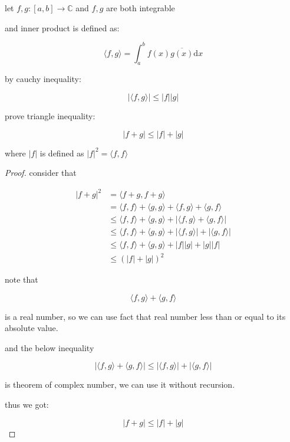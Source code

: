 \begin{exercise}
    let $f,g: [a,b] \to \mathbb{C}$ and $f,g$ are both integrable

    and inner product is defined as:

    \[
        \langle f, g \rangle = \int_a^{b} f(x) \overline{g(x)} \mathrm{d}x
    \]

    by cauchy inequality:

    \[
        \left| \langle f, g \rangle \right| \le \left| f \right| \left| g \right|
    \]
    
    prove triangle inequality:

    \[
        |f + g| \le |f| + |g|
    \]

    where $|f|$ is defined as $|f|^2 = \langle f, f \rangle $
\end{exercise}

\begin{proof}
    consider that

    \begin{align*}
        |f+g|^2 &= \langle f + g, f+g\rangle \\
        &= \langle f,f \rangle + \langle g,g \rangle + \langle f,g \rangle + \langle g,f  \rangle \\
        & \le  \langle f,f \rangle + \langle g,g \rangle +  \left| \langle f,g \rangle + \langle g,f  \rangle \right| \\
        & \le \langle f,f \rangle + \langle g,g \rangle +  \left| \langle f,g \rangle \right| + \left|\langle g,f  \rangle \right| \\
        & \le \langle f,f \rangle + \langle g,g \rangle +  \left| f \right| \left| g \right| + \left| g \right| \left| f \right|\\
        & \le \left( \left| f \right| + \left| g \right| \right)^2
    \end{align*}

    note that

    \[
        \langle f,g \rangle + \langle g,f  \rangle
    \]

    is a real number, so we can use fact that real number less than or equal to its absolute value.

    and the below inequality

    \[
\left| \langle f,g \rangle + \langle g,f  \rangle \right| \le \left|\langle f,g \rangle \right|  + \left| \langle g,f \rangle \right| 
    \]

    is theorem of complex number, we can use it without recursion.


    thus we got:

    \[
        |f+g| \le\left| f \right| + \left| g \right|
    \]
\end{proof}

